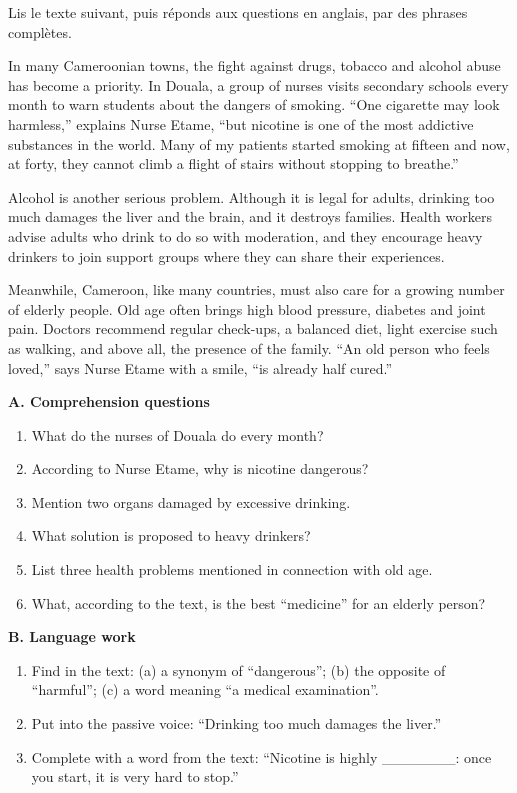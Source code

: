 \documentclass[11pt]{article}
\begin{document}
\begin{exercice}
Lis le texte suivant, puis réponds aux questions en anglais, par des phrases complètes.
\begin{textebox}
In many Cameroonian towns, the fight against drugs, tobacco and alcohol abuse has become a priority. In Douala, a group of nurses visits secondary schools every month to warn students about the dangers of smoking. “One cigarette may look harmless,” explains Nurse Etame, “but nicotine is one of the most addictive substances in the world. Many of my patients started smoking at fifteen and now, at forty, they cannot climb a flight of stairs without stopping to breathe.”

Alcohol is another serious problem. Although it is legal for adults, drinking too much damages the liver and the brain, and it destroys families. Health workers advise adults who drink to do so with moderation, and they encourage heavy drinkers to join support groups where they can share their experiences.

Meanwhile, Cameroon, like many countries, must also care for a growing number of elderly people. Old age often brings high blood pressure, diabetes and joint pain. Doctors recommend regular check-ups, a balanced diet, light exercise such as walking, and above all, the presence of the family. “An old person who feels loved,” says Nurse Etame with a smile, “is already half cured.”
\end{textebox}
\textbf{A. Comprehension questions}
\begin{enumerate}
\item What do the nurses of Douala do every month?
\item According to Nurse Etame, why is nicotine dangerous?
\item Mention two organs damaged by excessive drinking.
\item What solution is proposed to heavy drinkers?
\item List three health problems mentioned in connection with old age.
\item What, according to the text, is the best “medicine” for an elderly person?
\end{enumerate}
\textbf{B. Language work}
\begin{enumerate}
\item Find in the text: (a) a synonym of “dangerous”; (b) the opposite of “harmful”; (c) a word meaning “a medical examination”.
\item Put into the passive voice: “Drinking too much damages the liver.”
\item Complete with a word from the text: “Nicotine is highly \_\_\_\_\_\_\_: once you start, it is very hard to stop.”
\end{enumerate}
\end{exercice}
\end{document}
